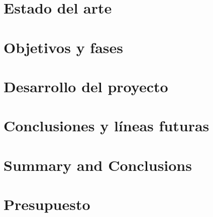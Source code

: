\documentclass[spanish,a4paper,14pt,oneside]{extreport}
\begin{document}
\chapter{Estado del arte}
\label{chapter:tres}




\chapter{Objetivos y fases}
\label{chapter:cuatro}



\newpage{\pagestyle{empty}}
\thispagestyle{empty}

\chapter{Desarrollo del proyecto}
\label{chapter:cinco}



\newpage{\pagestyle{empty}}
\thispagestyle{empty}

\chapter{Conclusiones y líneas futuras }
\label{chapter:Conclusiones}



\newpage{\pagestyle{empty}}
\thispagestyle{empty}

\chapter{Summary and Conclusions }
\label{chapter:ingles}



\newpage{\pagestyle{empty}}
\thispagestyle{empty}

\chapter{Presupuesto}
\label{chapter:Presupuesto}
\end{document}
